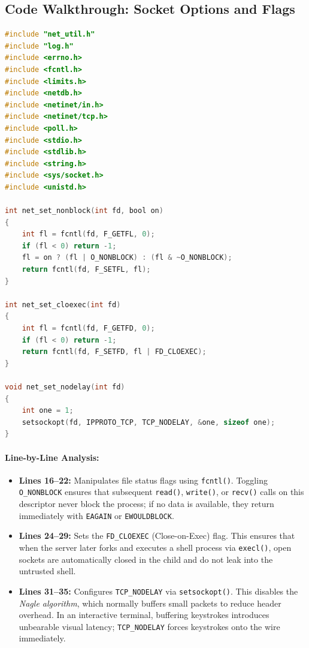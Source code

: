 \subsection{Code Walkthrough: Socket Options and Flags}

\begin{lstlisting}[language=C]
#include "net_util.h"
#include "log.h"
#include <errno.h>
#include <fcntl.h>
#include <limits.h>
#include <netdb.h>
#include <netinet/in.h>
#include <netinet/tcp.h>
#include <poll.h>
#include <stdio.h>
#include <stdlib.h>
#include <string.h>
#include <sys/socket.h>
#include <unistd.h>

int net_set_nonblock(int fd, bool on)
{
    int fl = fcntl(fd, F_GETFL, 0);
    if (fl < 0) return -1;
    fl = on ? (fl | O_NONBLOCK) : (fl & ~O_NONBLOCK);
    return fcntl(fd, F_SETFL, fl);
}

int net_set_cloexec(int fd)
{
    int fl = fcntl(fd, F_GETFD, 0);
    if (fl < 0) return -1;
    return fcntl(fd, F_SETFD, fl | FD_CLOEXEC);
}

void net_set_nodelay(int fd)
{
    int one = 1;
    setsockopt(fd, IPPROTO_TCP, TCP_NODELAY, &one, sizeof one);
}
\end{lstlisting}

\paragraph{Line-by-Line Analysis:}
\begin{itemize}[leftmargin=1.5em]
    \item \textbf{Lines 16--22:} Manipulates file status flags using \texttt{fcntl()}. Toggling \texttt{O\_NONBLOCK} ensures that subsequent \texttt{read()}, \texttt{write()}, or \texttt{recv()} calls on this descriptor never block the process; if no data is available, they return immediately with \texttt{EAGAIN} or \texttt{EWOULDBLOCK}.
    \item \textbf{Lines 24--29:} Sets the \texttt{FD\_CLOEXEC} (Close-on-Exec) flag. This ensures that when the server later forks and executes a shell process via \texttt{execl()}, open sockets are automatically closed in the child and do not leak into the untrusted shell.
    \item \textbf{Lines 31--35:} Configures \texttt{TCP\_NODELAY} via \texttt{setsockopt()}. This disables the \textit{Nagle algorithm}, which normally buffers small packets to reduce header overhead. In an interactive terminal, buffering keystrokes introduces unbearable visual latency; \texttt{TCP\_NODELAY} forces keystrokes onto the wire immediately.
\end{itemize}

